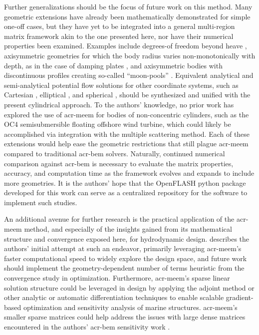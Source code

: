 \documentclass[ASNA,twocolumn]{USG} %
\begin{document}
Further generalizations should be the focus of future work on this method.
Many geometric extensions have already been mathematically demonstrated for simple one-off cases, but they have yet to be integrated into a general multi-region matrix framework akin to the one presented here, nor have their numerical properties been examined.
Examples include degrees-of freedom beyond heave \citep{yeung_added_1981}, axisymmetric geometries for which the body radius varies non-monotonically with depth, as in the case of damping plates \citep{olaya_hydrodynamic_2015}, and axisymmetric bodies with discontinuous profiles creating so-called ``moon-pools'' \citep{seah_symmetric_2006}.
Equivalent analytical and semi-analytical potential flow solutions for other coordinate systems, such as Cartesian \citep{michele_theory_2016,renzi_hydrodynamics_2013}, elliptical \citep{nguyen_theoretical_2024,nguyen_theoretical_2024-1}, and spherical \citep{chatjigeorgiou_analytical_2018}, 
should be synthesized and unified with the present cylindrical approach.
To the authors' knowledge, no prior work has explored the use of \gls{acr-meem} for bodies of non-concentric cylinders, such as the OC4 semisubmersible floating offshore wind turbine, which could likely be accomplished via integration with the multiple scattering method. 
Each of these extensions would help ease the geometric restrictions that still plague \gls{acr-meem} compared to traditional \gls{acr-bem} solvers.
Naturally, continued numerical comparison against \gls{acr-bem} is necessary to evaluate the matrix properties, accuracy, and computation time as the framework evolves and expands to include more geometries.
It is the authors' hope that the OpenFLASH python package developed for this work can serve as a centralized repository for the software to implement such studies.

An additional avenue for further research is the practical application of the \gls{acr-meem} method, and especially of the insights gained from its mathematical structure and convergence \behaviour{} exposed here, for hydrodynamic design.
\citet{mccabe_development_2026} describes the authors' initial attempt at such an endeavor, primarily leveraging \gls{acr-meem}'s faster computational speed to widely explore the design space, and future work should implement the geometry-dependent number of terms heuristic from the convergence study in optimization.
Furthermore, \gls{acr-meem}'s sparse linear solution structure could be leveraged in design by applying the adjoint method or other analytic or automatic differentiation techniques to enable scalable gradient-based optimization and sensitivity analysis of marine structures.
\gls{acr-meem}'s smaller sparse matrices could help address the issues with large dense matrices encountered in the authors' \gls{acr-bem} sensitivity work \citep{khanal_fully_2025}.
\end{document}
